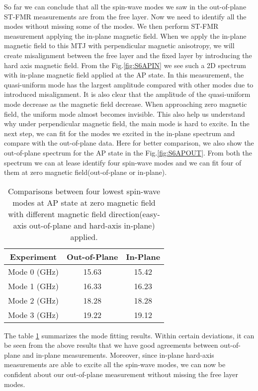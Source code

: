 So far we can conclude that all the spin-wave modes we saw in the out-of-plane ST-FMR measurements are from the free layer. Now we need to identify all the modes without missing some of the modes. We then perform ST-FMR measurement applying the in-plane magnetic field. When we apply the in-plane magnetic field to this MTJ with perpendicular magnetic anisotropy, we will create misalignment between the free layer and the fixed layer by introducing the hard axis magnetic field. From the Fig.\ref{fig:S6APIN} we see such a 2D spectrum with in-plane magnetic field applied at the AP state. In this measurement, the quasi-uniform mode has the largest amplitude compared with other modes due to introduced misalignment. It is also clear that the amplitude of the quasi-uniform mode decrease as the magnetic field decrease. When approaching zero magnetic field, the uniform mode almost becomes invisible. This also help us understand why under perpendicular magnetic field, the main mode is hard to excite. In the next step, we can fit for the modes we excited in the in-plane spectrum and compare with the out-of-plane data. Here for better comparison, we also show the out-of-plane spectrum for the AP state in the Fig.\ref{fig:S6APOUT}. From both the spectrum we can at lease identify four spin-wave modes and we can fit four of them at zero magnetic field(out-of-plane or in-plane). 


\begin{table}[h!]
\centering
\begin{tabular}{||c c c||} 
 \hline
 Experiment & Out-of-Plane & In-Plane\\ [0.5ex] 
 \hline\hline
 Mode 0 (GHz) & 15.63 & 15.42\\ 
 \hline
 Mode 1 (GHz) & 16.33 & 16.23\\
 \hline
 Mode 2 (GHz) & 18.28 & 18.28\\
 \hline
 Mode 3 (GHz) & 19.22 & 19.12 \\ [1ex] 
 \hline
\end{tabular}
\caption{Comparisons between four lowest spin-wave modes at AP state at zero magnetic field with different magnetic field direction(easy-axis out-of-plane and hard-axis in-plane) applied.}
\label{table:APtoP}
\end{table}

The table \ref{table:APtoP} summarizes the mode fitting results. Within certain deviations, it can be seen from the above results that we have good agreements between out-of-plane and in-plane measurements. Moreover, since in-plane hard-axis measurements are able to excite all the spin-wave modes, we can now be confident about our out-of-plane measurement without missing the free layer modes.
